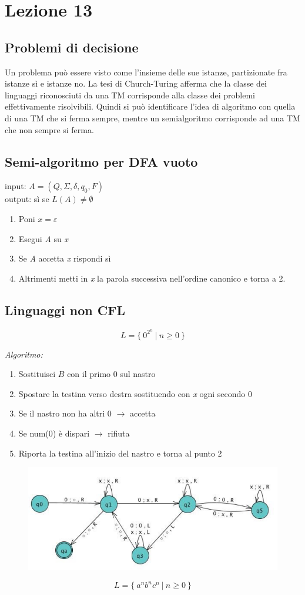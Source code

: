 
\section{Lezione 13}
\subsection{Problemi di decisione}

Un problema può essere visto come l'insieme delle sue istanze, partizionate fra istanze sì e istanze no.
La tesi di Church-Turing afferma che la classe dei linguaggi riconosciuti da una TM corrisponde alla classe dei problemi effettivamente risolvibili. Quindi si può identificare l'idea di algoritmo con quella di una TM che si ferma sempre, mentre un semialgoritmo corrisponde ad una TM che non sempre si ferma.


\subsection{Semi-algoritmo per DFA vuoto}

input: $A = (Q,\Sigma,\delta,q_0,F)$ \\
output: sì se $L(A) \neq \emptyset$ \\
\begin{enumerate}
	\item Poni $x=\varepsilon$
	\item Esegui \emph{A} su \emph{x}
	\item Se \emph{A} accetta \emph{x} rispondi sì
	\item Altrimenti metti in \emph{x} la parola successiva nell'ordine canonico e torna a 2. 
\end{enumerate}

\subsection{Linguaggi non CFL}

\[
	L = \{ \ 0^{2^n} \ | \ n \geq 0 \ \}
\]

\emph{Algoritmo:}
\begin{enumerate}
	\item Sostituisci $B$ con il primo 0 sul nastro
	\item Spostare la testina verso destra sostituendo con \emph{x} ogni secondo 0
	\item Se il nastro non ha altri 0 $\rightarrow$ accetta
	\item Se num(0) è dispari $\rightarrow$ rifiuta
	\item Riporta la testina all'inizio del nastro e torna al punto 2
\end{enumerate}

\begin{figure}[H]
	\includegraphics[scale=0.6]{TM1}
\end{figure}


\[
	L = \{ \ a^{n}b^{n}c^{n} \ | \ n \geq 0 \ \}
\]